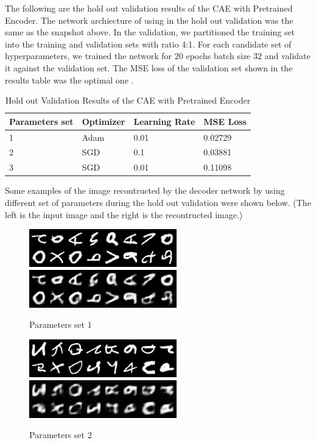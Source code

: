 \documentclass{article}
\begin{document}
The following are the hold out validation results of the CAE with Pretrained Encoder. The network archiecture of using in the hold out validation was the same as the snapshot above. In the validation, we partitioned the training set into the training and validation sets with ratio 4:1. For each candidate set of hyperparameters, we trained the network for $20$ epochs batch size $32$ and validate it against the validation set. The MSE loss of the validation set shown in the results table was the optimal one .


\begin{table}[htb]
\caption{Hold out Validation Results of the CAE with Pretrained Encoder}
	\label{sample-table}
	\centering
\begin{tabular}{llll}
\toprule
		\cmidrule{1-4}
		Parameters set& Optimizer & Learning Rate & MSE Loss\\
		\midrule
 			1 & Adam & 0.01 & 0.02729 \\
 			2 & SGD & 0.1 &  0.03881 \\
 			3 & SGD & 0.01 & 0.11098 \\
\bottomrule
\end{tabular}
\end{table}

Some examples of the image recontructed by the decoder network by using different set of parameters during the hold out validation were shown below.
(The left is the input image and the right is the recontructed image.)

\begin{figure}[h]
  \centering
  \includegraphics[scale=0.9]{val_raw_round1.png}
  \includegraphics[scale=0.9]{val_recond_round1.png}
  \caption{Parameters set 1}
\end{figure}



\begin{figure}[h]
	\centering
	\includegraphics[scale=0.9]{val_raw_round2.png}
	\includegraphics[scale=0.9]{val_recond_round2.png}
	\caption{Parameters set 2}
\end{figure}
\end{document}
